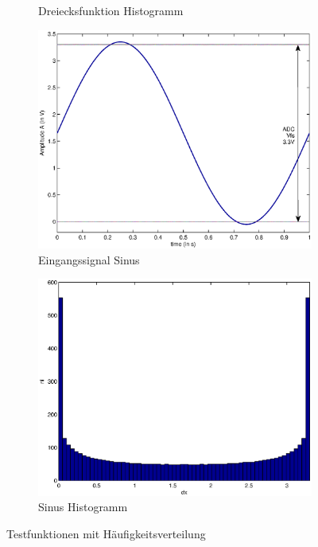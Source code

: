 \documentclass[SSS_Laborbericht.tex]{subfiles}
\begin{document}
\begin{figure}[H]
\begin{subfigure}{.499\textwidth}
		\caption{Dreiecksfunktion Histogramm}
		\label{fig:GRUNDL_RAMP_HIST_2X2}
	\end{subfigure}
	\begin{subfigure}{.499\textwidth}
		\centering\small
		\includegraphics[width=\textwidth]{media/matlab/HISTOGRAM/sin_fkt_samples_5000.eps}
		\caption{Eingangssignal Sinus}
		\label{fig:GRUNDL_SIN_SIN_2X2}
	\end{subfigure}%
	\begin{subfigure}{.499\textwidth}
		\centering\small
		\includegraphics[width=\textwidth]{media/matlab/HISTOGRAM/sin_hist_samples_5000.eps}
		\caption{Sinus Histogramm}
		\label{fig:GRUNDL_SIN_HIST_2X2}	
	\end{subfigure}
\caption{Testfunktionen mit Häufigkeitsverteilung}
\label{fig:GRUNDL_RAMP_SIN_HIST_2X2}
\end{figure}
\end{document}
